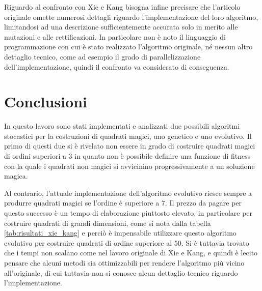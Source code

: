 \documentclass[italian,twoside,twocolumn]{article}
\begin{document}
Riguardo al confronto con Xie e Kang bisogna infine precisare che l'articolo originale omette numerosi dettagli riguardo l'implementazione del loro algoritmo, limitandosi ad una descrizione sufficientemente accurata solo in merito alle mutazioni e alle rettificazioni. In particolare non è noto il linguaggio di programmazione con cui è stato realizzato l'algoritmo originale, né nessun altro dettaglio tecnico, come ad esempio il grado di parallelizzazione dell'implementazione, quindi il confronto va considerato di conseguenza. 

\section{Conclusioni}

In questo lavoro sono stati implementati e analizzati due possibili algoritmi stocastici per la costruzioni di quadrati magici, uno genetico e uno evolutivo. Il primo di questi due si è rivelato non essere in grado di costruire quadrati magici di ordini superiori a 3 in quanto non è possibile definire una funzione di fitness con la quale i quadrati non magici si avvicinino progressivamente a un soluzione magica. 

Al contrario, l'attuale implementazione dell'algoritmo evolutivo riesce sempre a produrre quadrati magici se l'ordine è superiore a 7. Il prezzo da pagare per questo successo è un tempo di elaborazione piuttosto elevato, in particolare per costruire quadrati di grandi dimensioni, come si nota dalla tabella \ref{tab:risultati_xie_kang} e perciò è impensabile utilizzare questo algoritmo evolutivo per costruire quadrati di ordine superiore al 50. Si è tuttavia trovato che i tempi non scalano come nel lavoro originale di Xie e Kang, e quindi è lecito pensare che alcuni metodi sia ottimizzabili per rendere l'algoritmo più vicino all'originale, di cui tuttavia non si conosce alcun dettaglio tecnico riguardo l'implementazione. 

\end{document}
